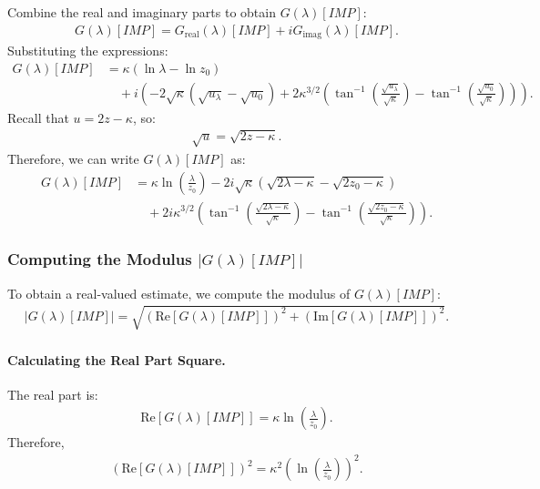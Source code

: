 Combine the real and imaginary parts to obtain $G(\lambda)[IMP]$:
\begin{align}
G(\lambda)[IMP] = G_{\text{real}}(\lambda)[IMP] + i G_{\text{imag}}(\lambda)[IMP].
\end{align}
%
Substituting the expressions:
\begin{align}
\nonumber
G(\lambda)[IMP] 
   &= \kappa \left( \ln \lambda - \ln z_0 \right )   \\
   &\quad + i \left( - 2 \sqrt{ \kappa } \left( \sqrt{ u_\lambda } - \sqrt{ u_0 } \right ) + 2 \kappa^{ 3/2 } \left( \tan^{-1} \left( \frac{ \sqrt{ u_\lambda } }{ \sqrt{ \kappa } } \right ) - \tan^{-1} \left( \frac{ \sqrt{ u_0 } }{ \sqrt{ \kappa } } \right ) \right ) \right ).
\end{align}
%
Recall that $u = 2z - \kappa$, so:
\begin{align}
\sqrt{ u } = \sqrt{ 2z - \kappa }.
\end{align}
%
Therefore, we can write $G(\lambda)[IMP]$ as:
\begin{align}
\nonumber
G(\lambda)[IMP] 
   &= \kappa \ln \left( \frac{ \lambda }{ z_0 } \right ) - 2 i \sqrt{ \kappa } \left( \sqrt{ 2 \lambda - \kappa } - \sqrt{ 2 z_0 - \kappa } \right ) \\
   &\quad + 2 i \kappa^{ 3/2 } \left( \tan^{-1} \left( \frac{ \sqrt{ 2 \lambda - \kappa } }{ \sqrt{ \kappa } } \right ) - \tan^{-1} \left( \frac{ \sqrt{ 2 z_0 - \kappa } }{ \sqrt{ \kappa } } \right ) \right ).
\end{align}


\subsubsection{Computing the Modulus $|G(\lambda)[IMP]|$}

To obtain a real-valued estimate, we compute the modulus of $G(\lambda)[IMP]$:
\begin{align}
| G(\lambda)[IMP] | = \sqrt{ \left( \text{Re}[ G(\lambda)[IMP] ] \right )^2 + \left( \text{Im}[ G(\lambda)[IMP] ] \right )^2 }.
\end{align}


\paragraph{Calculating the Real Part Square.}

The real part is:
\begin{align}
\text{Re}[ G(\lambda)[IMP] ] = \kappa \ln \left( \frac{ \lambda }{ z_0 } \right ).
\end{align}
%
Therefore,
\begin{align}
\left( \text{Re}[ G(\lambda)[IMP] ] \right )^2 = \kappa^2 \left( \ln \left( \frac{ \lambda }{ z_0 } \right ) \right )^2.
\end{align}


